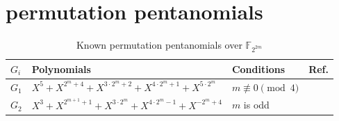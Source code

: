 \documentclass[12pt]{amsart}
\numberwithin{equation}{section}
\theoremstyle{definition}
\newcommand{\F}{\mathbb F}
\begin{document}
\section{permutation pentanomials}\label{pent}
\begin{longtable}{|m{2em}|m{21em}|m{9em}|m{2em}|}
\caption{Known permutation pentanomials over $\F_{2^{2m}}$ \label{Table1}}\\
 \hline
$G_{i}$ & Polynomials & Conditions & Ref.\\
\hline
$G_{1}$& $X^5 + X^{2^m+4} + X^{3 \cdot 2^m+2} + X^{4 \cdot 2^m +1} + X^{5 \cdot 2^m}$ & $m \not \equiv 0 \pmod 4$ & \cite{Xu_penta_18} \\
\hline
$G_{2}$& $X^3 + X^{2^{m+1}+1} + X^{3 \cdot 2^m} + X^{4 \cdot 2^m -1} + X^{-2^m+4}$ & $m$ is odd & \cite{Xu_penta_18}\\
\hline


\end{longtable}
\end{document}
